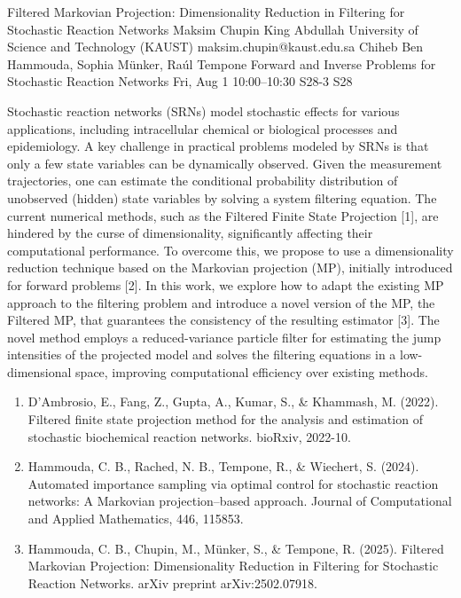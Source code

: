 \documentclass[12pt,lettersize,oneside]{book} %
\begin{document}
\begin{talk}
  {Filtered Markovian Projection: Dimensionality Reduction in Filtering for Stochastic Reaction Networks}%
  {Maksim Chupin}%
  {King Abdullah University of Science and Technology (KAUST)}%
  {maksim.chupin@kaust.edu.sa}%
  {Chiheb Ben Hammouda, Sophia M\"{u}nker, Ra\'{u}l Tempone}%
  {Forward and Inverse Problems for Stochastic Reaction Networks}%
  {Fri, Aug 1 10:00--10:30}%
  {S28-3}%
  {S28}%
    
   
Stochastic reaction networks (SRNs) model stochastic effects for various applications, including intracellular chemical or biological processes and epidemiology. A key challenge in practical problems modeled by SRNs is that only a few state variables can be dynamically observed. Given the measurement trajectories, one can estimate the conditional probability distribution of unobserved (hidden) state variables by solving a system filtering equation. The current numerical methods, such as the Filtered Finite State Projection [1], are hindered by the curse of dimensionality, significantly affecting their computational performance. To overcome this, we propose to use a dimensionality reduction technique based on the Markovian projection (MP), initially introduced for forward problems [2]. In this work, we explore how to adapt the existing MP approach to the filtering problem and introduce a novel version of the MP, the Filtered MP, that guarantees the consistency of the resulting estimator [3]. The novel method employs a reduced-variance particle filter for estimating the jump intensities of the projected model and solves the filtering equations in a low-dimensional space, improving computational efficiency over existing methods.





\medskip

\begin{enumerate}
 \item[{[1]}] D’Ambrosio, E., Fang, Z., Gupta, A., Kumar, S., \& Khammash, M. (2022). Filtered finite state projection method for the analysis and estimation of stochastic biochemical reaction networks. bioRxiv, 2022-10.
 \item[{[2]}] Hammouda, C. B., Rached, N. B., Tempone, R., \& Wiechert, S. (2024). Automated importance sampling via optimal control for stochastic reaction networks: A Markovian projection--based approach. Journal of Computational and Applied Mathematics, 446, 115853.
    \item [{[3]}] Hammouda, C. B., Chupin, M., M\"unker, S., \& Tempone, R. (2025). Filtered Markovian Projection: Dimensionality Reduction in Filtering for Stochastic Reaction Networks. arXiv preprint arXiv:2502.07918.
\end{enumerate}


\end{talk}
\end{document}
